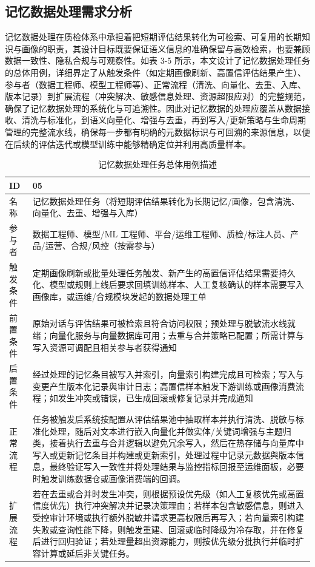 \subsection{记忆数据处理需求分析}
记忆数据处理在质检体系中承担着把短期评估结果转化为可检索、可复用的长期知识与画像的职责，其设计目标既要保证语义信息的准确保留与高效检索，也要兼顾数据一致性、隐私合规与可观察性。如表 3-5 所示，本文设计了记忆数据处理任务的总体用例，详细界定了从触发条件（如定期画像刷新、高置信评估结果产生）、参与者（数据工程师、模型工程师等）、正常流程（清洗、向量化、去重、入库、版本记录）到扩展流程（冲突解决、敏感信息处理、资源超限应对）的完整规范，确保了记忆数据处理的系统化与可追溯性。因此对记忆数据的处理应覆盖从数据接收、清洗与标准化，到语义向量化、增强与去重，再到写入/更新策略与生命周期管理的完整流水线，确保每一步都有明确的元数据标识与可回溯的来源信息，以便在后续的评估迭代或模型训练中能够精确定位并利用高质量样本。
\begin{table}[h]
\centering
\caption{记忆数据处理任务总体用例描述}
\label{tab:memory_processing_usecase}
{\renewcommand{\arraystretch}{1.2}
\begin{tabular}{p{} p{}}
\hline
ID & 05 \\
\hline
名称 & 记忆数据处理任务（将短期评估结果转化为长期记忆/画像，包含清洗、向量化、去重、增强与入库） \\
\hline
参与者 & 数据工程师、模型/ML 工程师、平台/运维工程师、质检/标注人员、产品/运营、合规/风控（按需参与） \\
\hline
触发条件 & 定期画像刷新或批量处理任务触发、新产生的高置信评估结果需要持久化、模型或规则上线后要求回填训练样本、人工复核确认的样本需要写入画像库，或运维/合规模块发起的数据处理工单 \\
\hline
前置条件 & 原始对话与评估结果可被检索且符合访问权限；预处理与脱敏流水线就绪；向量化服务与向量数据库可用；去重与合并策略已配置；所需计算与写入资源可调配且相关参与者获得通知 \\
\hline
后置条件 & 经过处理的记忆条目被写入并索引，向量索引构建完成且可检索；写入与变更产生版本化记录與审计日志；高置信样本触发下游训练或画像消费流程；如发生冲突或错误，已生成回滚或修复记录并完成通知 \\
\hline
正常流程 & 任务被触发后系统按配置从评估结果池中抽取样本并执行清洗、脱敏与标准化处理，随后对文本进行嵌入向量化并做实体/关键词增强与主题归类，接着执行去重与合并逻辑以避免冗余写入，然后在热存储与向量库中写入或更新记忆条目并构建或更新索引，处理过程中记录元数据與版本信息，最终验证写入一致性并将处理结果与监控指标回报至运维面板，必要时触发训练数据仓或画像消费端的回调。 \\
\hline
扩展流程 & 若在去重或合并时发生冲突，则根据预设优先级（如人工复核优先或高置信度优先）执行冲突解决并记录决策理由；若样本包含敏感信息，则进入受控审计环境或执行额外脱敏并请求更高权限后再写入；若向量索引构建失败或查询性能下降，则触发重建、回滚或临时降级为冷存取，并在修复后进行回归验证；若处理量超出资源能力，则按优先级分批执行并临时扩容计算或延后非关键任务。 \\
\hline
\end{tabular}
}
\end{table}
